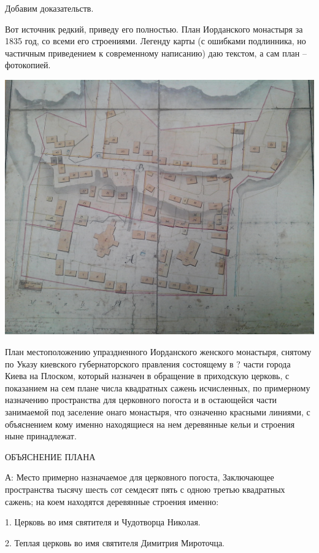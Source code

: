 Добавим доказательств.

Вот источник редкий, приведу его полностью. План Иорданского монастыря за 1835 год, со всеми его строениями. Легенду карты (с ошибками подлинника, но частичным приведением к современному написанию) даю текстом, а сам план – фотокопией.

\begin{center}
\includegraphics[width=\linewidth]{chast-kirvys/iordanruch/IMG_20170627_142118.jpg}
\end{center}

План местоположению упраздненного Иорданского женского монастыря, снятому по Указу киевского губернаторского правления состоящему в ? части города Киева на Плоском, который назначен в обращение в приходскую церковь, с показанием на сем плане числа квадратных сажень исчисленных, по примерному назначению пространства для церковного погоста и в остающейся части занимаемой под заселение онаго монастыря, что означенно красными линиями, с объяснением кому именно находящиеся на нем деревянные кельи и строения ныне принадлежат.

\newpage

ОБЪЯСНЕНИЕ ПЛАНА

А: Место примерно назначаемое для церковного погоста, Заключающее пространства тысячу шесть сот семдесят пять с одною третью квадратных сажень; на коем находятся деревянные строения именно:

1. Церковь во имя святителя и Чудотворца Николая.

2. Теплая церковь во имя святителя Димитрия Мироточца.

